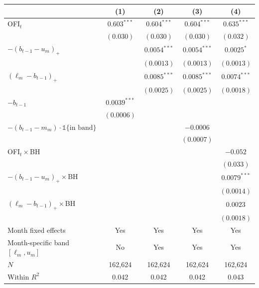 \begin{tabular}{lcccc}
\toprule
 & (1) & (2) & (3) & (4) \\
\midrule
OFI$_t$ & $0.603^{***}$ & $0.604^{***}$ & $0.604^{***}$ & $0.635^{***}$ \\
 & $(0.030)$ & $(0.030)$ & $(0.030)$ & $(0.032)$ \\
$-(b_{t-1}-u_m)_+$ \;[$\kappa^+$] &  & $0.0054^{***}$ & $0.0054^{***}$ & $0.0025^{*}$ \\
 &  & $(0.0013)$ & $(0.0013)$ & $(0.0013)$ \\
$(\ell_m-b_{t-1})_+$ \;[$\kappa^-$] &  & $0.0085^{***}$ & $0.0085^{***}$ & $0.0074^{***}$ \\
 &  & $(0.0025)$ & $(0.0025)$ & $(0.0018)$ \\
$-b_{t-1}$  & $0.0039^{***}$ &  &  &  \\
 & $(0.0006)$ &  &  &  \\
$-(b_{t-1}-m_m)\cdot\mathbb 1\{\text{in band}\}$ &  &  & $-0.0006$ &  \\
 &  &  & $(0.0007)$ &  \\
OFI$_t\times$BH &  &  &  & $-0.052$ \\
 &  &  &  & $(0.033)$ \\
$-(b_{t-1}-u_m)_+\times$BH &  &  &  & $0.0079^{***}$ \\
 &  &  &  & $(0.0014)$ \\
$(\ell_m-b_{t-1})_+\times$BH &  &  &  & $0.0023$ \\
 &  &  &  & $(0.0018)$ \\
\midrule
Month fixed effects & Yes & Yes & Yes & Yes \\
Month-specific band $[\ell_m,u_m]$ & No & Yes & Yes & Yes \\
$N$ & 162,624 & 162,624 & 162,624 & 162,624 \\
Within $R^2$ & 0.042 & 0.042 & 0.042 & 0.043 \\
\bottomrule
\end{tabular}
